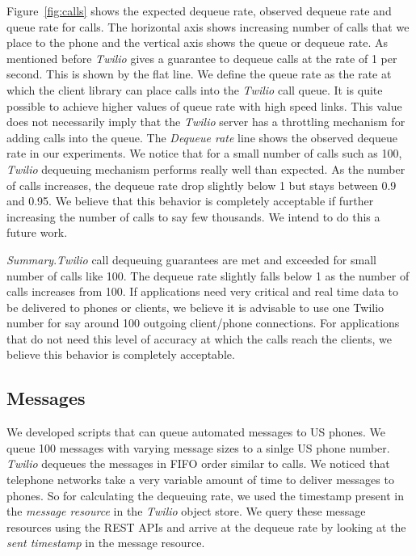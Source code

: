 Figure~\ref{fig:calls} shows the expected dequeue rate, observed dequeue rate and queue rate for calls. The horizontal axis shows increasing number of calls that we place to the phone and the vertical axis shows the queue or dequeue rate. As mentioned before \textit{Twilio} gives a guarantee to dequeue calls at the rate of 1 per second. This is shown by the flat line. We define the queue rate as the rate at which the client library can place calls into the \textit{Twilio} call queue. It is quite possible to achieve higher values of queue rate with high speed links. This value does not necessarily imply that the \textit{Twilio} server has a throttling mechanism for adding calls into the queue. The \textit{Dequeue rate} line shows the observed dequeue rate in our experiments. We notice that for a small number of calls such as 100, \textit{Twilio} dequeuing mechanism performs really well than expected. As the number of calls increases, the dequeue rate drop slightly below 1 but stays between 0.9 and 0.95. We believe that this behavior is completely acceptable if further increasing the number of calls to say few thousands. We intend to do this a future work. 

\textit{Summary}.\textit{Twilio} call dequeuing guarantees are met and exceeded for small number of calls like 100. The dequeue rate slightly falls below 1 as the number of calls increases from 100. If applications need very critical and real time data to be delivered to phones or clients, we believe it is advisable to use one Twilio number for say around 100 outgoing client/phone connections. For applications that do not need this level of accuracy at which the calls reach the clients, we believe this behavior is completely acceptable. 

\subsection{Messages}
\label{sec-measurements-sms}
We developed scripts that can queue automated messages to US phones. We queue 100 messages with varying message sizes to a sinlge US phone number. \textit{Twilio} dequeues the messages in FIFO order similar to calls. We noticed that telephone networks take a very variable amount of time to deliver messages to phones. So for calculating the dequeuing rate, we used the timestamp present in the \textit{message resource} in the \textit{Twilio} object store. We query these message resources using the REST APIs and arrive at the dequeue rate by looking at the \textit{sent timestamp} in the message resource.   

